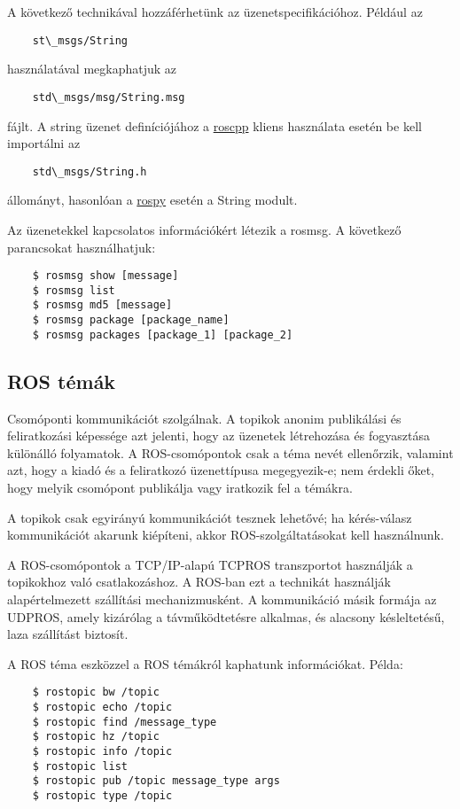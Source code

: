 \documentclass{article}
\begin{document}
A következő technikával hozzáférhetünk az üzenetspecifikációhoz. Például az \begin{verbatim}
    st\_msgs/String
\end{verbatim} használatával megkaphatjuk az \begin{verbatim}
    std\_msgs/msg/String.msg
\end{verbatim} fájlt. A string üzenet definíciójához a \href{http://wiki.ros.org/roscpp}{roscpp} kliens használata esetén be kell importálni az \begin{verbatim}
    std\_msgs/String.h
\end{verbatim} állományt, hasonlóan a \href{http://wiki.ros.org/rospy}{rospy} esetén a String modult.
\begin{comment}
Annak megállapításakor, hogy a szerver és a kliens ugyanazokat az üzenetadattípusokat használja-e, a ROS az MD5 ellenőrző összegeket is összehasonlítja.    
\end{comment}
Az üzenetekkel kapcsolatos információkért létezik a rosmsg. A következő parancsokat használhatjuk: 
\begin{verbatim}
    $ rosmsg show [message]
    $ rosmsg list
    $ rosmsg md5 [message]
    $ rosmsg package [package_name]
    $ rosmsg packages [package_1] [package_2]
\end{verbatim}

\subsection{ROS témák}
Csomóponti kommunikációt szolgálnak. A topikok anonim publikálási és feliratkozási képessége azt jelenti, hogy az üzenetek létrehozása és fogyasztása különálló folyamatok. A ROS-csomópontok csak a téma nevét ellenőrzik, valamint azt, hogy a kiadó és a feliratkozó üzenettípusa megegyezik-e; nem érdekli őket, hogy melyik csomópont publikálja vagy iratkozik fel a témákra.

A topikok csak egyirányú kommunikációt tesznek lehetővé; ha kérés-válasz kommunikációt akarunk kiépíteni, akkor ROS-szolgáltatásokat kell használnunk.

A ROS-csomópontok a TCP/IP-alapú TCPROS transzportot használják a topikokhoz való csatlakozáshoz. A ROS-ban ezt a technikát használják alapértelmezett szállítási mechanizmusként. A kommunikáció másik formája az UDPROS, amely kizárólag a távműködtetésre alkalmas, és alacsony késleltetésű, laza szállítást biztosít.

A ROS téma eszközzel a ROS témákról kaphatunk információkat. Példa:
\begin{verbatim}
    $ rostopic bw /topic
    $ rostopic echo /topic
    $ rostopic find /message_type
    $ rostopic hz /topic
    $ rostopic info /topic
    $ rostopic list
    $ rostopic pub /topic message_type args
    $ rostopic type /topic
\end{verbatim}
\end{document}
